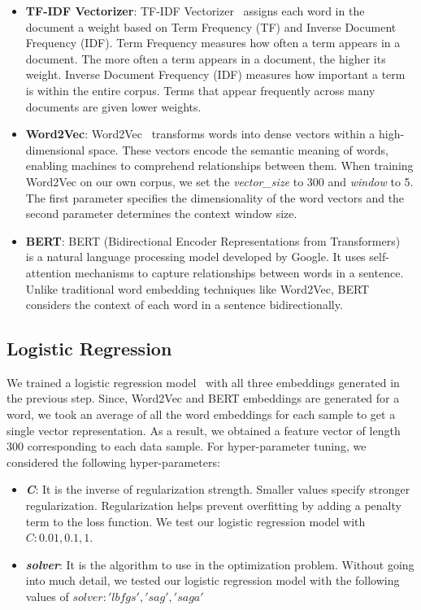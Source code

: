 \documentclass[conference]{IEEEtran}
\begin{document}
\begin{itemize}
    \item \textbf{TF-IDF Vectorizer}: TF-IDF Vectorizer~\cite{tfidf} assigns each word in the document a weight based on Term Frequency (TF) and Inverse Document Frequency (IDF). Term Frequency measures how often a term appears in a document. The more often a term appears in a document, the higher its weight. Inverse Document Frequency (IDF) measures how important a term is within the entire corpus. Terms that appear frequently across many documents are given lower weights.
    \item \textbf{Word2Vec}: Word2Vec~\cite{word2vec} transforms words into dense vectors within a high-dimensional space. These vectors encode the semantic meaning of words, enabling machines to comprehend relationships between them. When training Word2Vec on our own corpus, we set the \textit{vector\_size} to 300 and \textit{window} to 5. The first parameter specifies the dimensionality of the word vectors and the second parameter determines the context window size. 
    \item \textbf{BERT}: BERT (Bidirectional Encoder Representations from Transformers)~\cite{devlin2019bert} is a natural language processing model developed by Google. It uses self-attention mechanisms to capture relationships between words in a sentence. Unlike traditional word embedding techniques like Word2Vec, BERT considers the context of each word in a sentence bidirectionally.
\end{itemize}

\subsection{Logistic Regression}
We trained a logistic regression model~\cite{Komarek-2004-8925} with all three embeddings generated in the previous step. Since, Word2Vec and BERT embeddings are generated for a word, we took an average of all the word embeddings for each sample to get a single vector representation. As a result, we obtained a feature vector of length 300 corresponding to each data sample. For hyper-parameter tuning, we considered the following hyper-parameters:

\begin{itemize}
    \item \textbf{\textit{C}}: It is the inverse of regularization strength. Smaller values specify stronger regularization. Regularization helps prevent overfitting by adding a penalty term to the loss function. We test our logistic regression model with~$C: {0.01, 0.1, 1}$.
    \item \textbf{\textit{solver}}: It is the algorithm to use in the optimization problem. Without going into much detail, we tested our logistic regression model with the following values of $solver: {'lbfgs', 'sag', 'saga'}$
\end{itemize}
\end{document}
